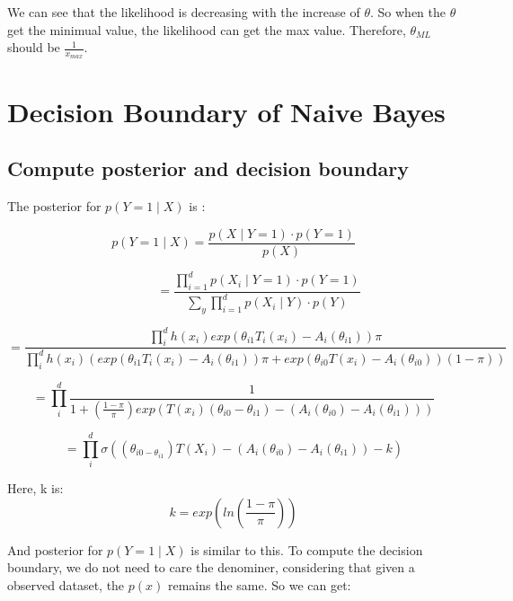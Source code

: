 \documentclass{article} %
\begin{document}
We can see that the likelihood is decreasing with the increase of
$\theta$. So when the $\theta$ get the minimual value, the likelihood can get
the max value. Therefore, $\theta_{ML}$ should be $\frac{1}{x_{max}}$.



\section{Decision Boundary of Naive Bayes}

\subsection{Compute posterior and decision boundary}
The posterior for $p(Y=1 \mid X)$ is :

\begin{equation}
p(Y=1 \mid X) = \frac{p(X \mid Y=1) \cdot p(Y=1)}{p(X)}
\end{equation}

\begin{equation}
\qquad \qquad = \frac{\prod_{i=1}^d p(X_i \mid Y=1) \cdot p(Y=1)}
{\sum_y \prod_{i=1}^d p(X_i \mid Y) \cdot p(Y)}
\end{equation}

\begin{equation}
= \frac{\prod_i^d h(x_i) exp(\theta_{i1} T_i(x_i) - A_i(\theta_{i1})) \pi}
{\prod_i^d h(x_i) (exp(\theta_{i1} T_i(x_i) - A_i(\theta_{i1})) \pi +
exp(\theta_{i0} T(x_i) - A_i(\theta_{i0})) (1 - \pi))}
\end{equation}

\begin{equation}
= \prod_i^d \frac{1}
{1 + (\frac{1 - \pi}{\pi}) exp(T(x_i)(\theta_{i0} - \theta_{i1}) -
(A_i(\theta_{i0}) - A_i(\theta_{i1})))}
\end{equation}

\begin{equation}
= \prod_i^d \sigma((\theta_{i0 - \theta_{i1}})T(X_i) - (A_i(\theta_{i0}) -
A_i(\theta_{i1})) - k)
\end{equation}

Here, k is:
\begin{equation}
k = exp(ln(\frac{1-\pi}{\pi}))
\end{equation}

And posterior for $p(Y=1 \mid X)$ is similar to this. To compute the decision
boundary, we do not need to care the denominer, considering that given a
observed dataset, the $p(x)$ remains the same. So we can get:
\end{document}
